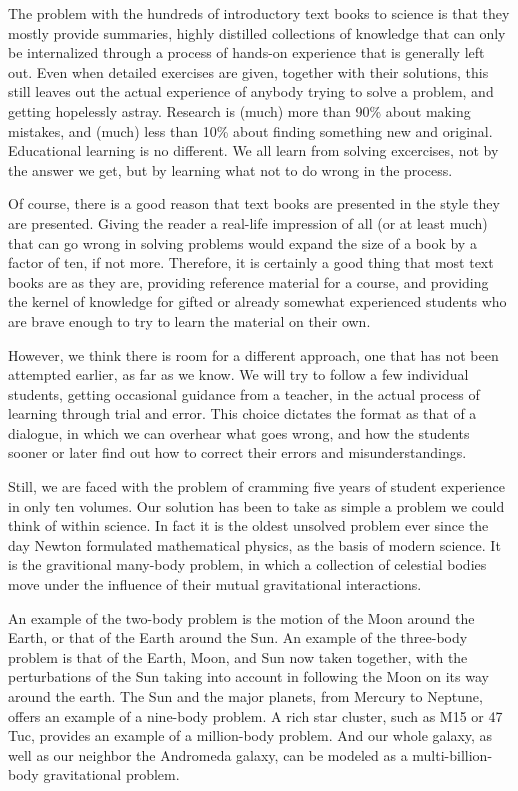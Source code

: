 The problem with the hundreds of introductory text books to science is
that they mostly provide summaries, highly distilled collections of
knowledge that can only be internalized through a process of hands-on
experience that is generally left out.  Even when detailed exercises
are given, together with their solutions, this still leaves out the
actual experience of anybody trying to solve a problem, and getting
hopelessly astray.  Research is (much) more than 90\% about making
mistakes, and (much) less than 10\% about finding something new and
original.  Educational learning is no different.  We all learn from
solving excercises, not by the answer we get, but by learning what not
to do wrong in the process.

Of course, there is a good reason that text books are presented in the
style they are presented.  Giving the reader a real-life impression of
all (or at least much) that can go wrong in solving problems would
expand the size of a book by a factor of ten, if not more.  Therefore,
it is certainly a good thing that most text books are as they are,
providing reference material for a course, and providing the kernel of
knowledge for gifted or already somewhat experienced students who are
brave enough to try to learn the material on their own.

However, we think there is room for a different approach, one that has
not been attempted earlier, as far as we know.  We will try to follow
a few individual students, getting occasional guidance from a teacher,
in the actual process of learning through trial and error.  This
choice dictates the format as that of a dialogue, in which we can
overhear what goes wrong, and how the students sooner or later find
out how to correct their errors and misunderstandings.

Still, we are faced with the problem of cramming five years of student
experience in only ten volumes.  Our solution has been to take as
simple a problem we could think of within science.  In fact it is the
oldest unsolved problem ever since the day Newton formulated
mathematical physics, as the basis of modern science.  It is the
gravitional many-body problem, in which a collection of celestial
bodies move under the influence of their mutual gravitational
interactions.

An example of the two-body problem is the motion of the Moon around
the Earth, or that of the Earth around the Sun.  An example of the
three-body problem is that of the Earth, Moon, and Sun now taken
together, with the perturbations of the Sun taking into account in
following the Moon on its way around the earth.  The Sun and the major
planets, from Mercury to Neptune, offers an example of a nine-body
problem.  A rich star cluster, such as M15 or 47 Tuc, provides an
example of a million-body problem.  And our whole galaxy, as well as
our neighbor the Andromeda galaxy, can be modeled as a
multi-billion-body gravitational problem.

